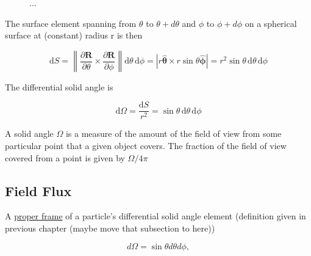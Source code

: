 \begin{figure}
	\caption{...}
\end{figure}

The surface element spanning from $\theta$ to $\theta + d\theta$ and $\phi$ to $\phi + d\phi$ on a spherical surface at (constant) radius r is then

\begin{equation}
	\mathrm{d}S =
	\left\|\frac{\partial {\mathbf R}}{\partial \theta} \times \frac{\partial {\mathbf R}}{\partial \phi}\right\| \mathrm{d}\theta \,\mathrm{d}\phi = \left| r \mathbf{\mathbf{\hat{\text{$\theta$}}}} \times r \sin \theta \mathbf{\mathbf{\hat{\text{$\phi$}}}} \right|= r^2 \sin\theta \,\mathrm{d}\theta \,\mathrm{d}\phi
\end{equation}

The differential solid angle is

\begin{equation}
	\mathrm{d}\Omega = \frac{\mathrm{d}S}{r^2} = \sin\theta \,\mathrm{d}\theta \,\mathrm{d}\phi
\end{equation}%

A solid angle $\Omega$ is a measure of the amount of the field of view from some particular point that a given object covers.
The fraction of the field of view covered from a point is given by $\Omega/ 4\pi$

\subsection{Field Flux}

A \hyperlink{def-proper-frame}{proper frame} of a particle's differential solid angle element  (definition given in previous chapter (maybe move that subsection to here))

\begin{equation}
	d\Omega = \sin{\theta} d\theta d\phi,
\end{equation}

